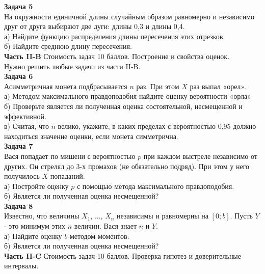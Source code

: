 \documentclass[12pt, a4paper]{article}\usepackage[]{graphicx}\usepackage[]{color}
\begin{document}
\textbf{Задача 5} \\
На окружности единичной длины случайным образом равномерно и независимо друг от друга выбирают две дуги: длины 0,3 и длины 0,4. \\
а) Найдите функцию распределения длины пересечения этих отрезков. \\
б) Найдите среднюю длину пересечения. \\



\textbf{Часть II-B} Стоимость задач 10 баллов. Построение и свойства оценок. \\

Нужно решить любые \textbf{} задачи из части II-B. \\

\textbf{Задача 6} \\
Асимметричная монета подбрасывается $n$ раз. При этом $X$ раз выпал «орел». \\
а) Методом максимального правдоподобия найдите оценку вероятности «орла» \\
б) Проверьте является ли полученная оценка состоятельной, несмещенной и эффективной.\\
в) Считая, что $n$ велико, укажите, в каких пределах с вероятностью 0,95 должно находиться значение оценки, если монета симметрична. \\


\textbf{Задача 7} \\
Вася попадает по мишени с вероятностью $p$ при каждом выстреле независимо от других. Он стрелял до 3-х промахов (не обязательно подряд). При этом у него получилось $X$ попаданий. \\
а) Постройте оценку $p$ с помощью метода максимального правдоподобия. \\
б) Является ли полученная оценка несмещенной? \\


\textbf{Задача 8} \\
Известно, что величины $X_{1}$, ..., $X_{n}$ независимы и равномерны на $[0;b]$. Пусть $Y$- это минимум этих $n$ величин. Вася знает $n$ и $Y$. \\
а) Найдите оценку $b$ методом моментов. \\
б) Является ли полученная оценка несмещенной? \\


\textbf{Часть II-C} Стоимость задач 10 баллов. Проверка гипотез и доверительные интервалы. \\
\end{document}
